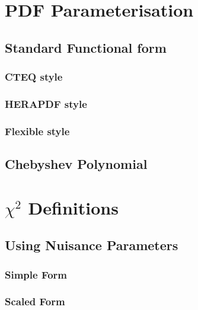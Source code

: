 \documentclass[11pt,a4paper]{article}
\begin{document}
\section{PDF Parameterisation}
\label{sec:pdfparam}
\subsection{Standard Functional form}
\subsubsection{CTEQ style}
\subsubsection{HERAPDF style}
\subsubsection{Flexible style}
\subsection{Chebyshev Polynomial}

\section{$\chi^2$ Definitions}
\label{sec:chi2}
\subsection{Using Nuisance Parameters}
\subsubsection{Simple Form}

\subsubsection{Scaled Form}
\end{document}
